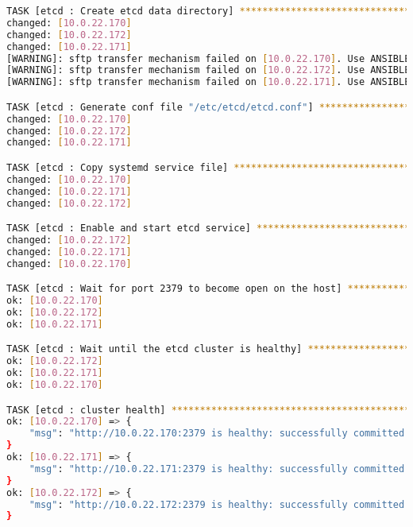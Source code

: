 \begin{flushleft}
\begin{lstlisting}[language=bash, caption=Deploy - Anhang - Deployt,captionpos=b,label={lst:deploy-appendix-deployt},breaklines=true]
TASK [etcd : Create etcd data directory] **************************************************************************************************************************************************************************
changed: [10.0.22.170]
changed: [10.0.22.172]
changed: [10.0.22.171]
[WARNING]: sftp transfer mechanism failed on [10.0.22.170]. Use ANSIBLE_DEBUG=1 to see detailed information
[WARNING]: sftp transfer mechanism failed on [10.0.22.172]. Use ANSIBLE_DEBUG=1 to see detailed information
[WARNING]: sftp transfer mechanism failed on [10.0.22.171]. Use ANSIBLE_DEBUG=1 to see detailed information

TASK [etcd : Generate conf file "/etc/etcd/etcd.conf"] ************************************************************************************************************************************************************
changed: [10.0.22.170]
changed: [10.0.22.172]
changed: [10.0.22.171]

TASK [etcd : Copy systemd service file] ***************************************************************************************************************************************************************************
changed: [10.0.22.170]
changed: [10.0.22.171]
changed: [10.0.22.172]

TASK [etcd : Enable and start etcd service] ***********************************************************************************************************************************************************************
changed: [10.0.22.172]
changed: [10.0.22.171]
changed: [10.0.22.170]

TASK [etcd : Wait for port 2379 to become open on the host] *******************************************************************************************************************************************************
ok: [10.0.22.170]
ok: [10.0.22.172]
ok: [10.0.22.171]

TASK [etcd : Wait until the etcd cluster is healthy] **************************************************************************************************************************************************************
ok: [10.0.22.172]
ok: [10.0.22.171]
ok: [10.0.22.170]

TASK [etcd : cluster health] **************************************************************************************************************************************************************************************
ok: [10.0.22.170] => {
    "msg": "http://10.0.22.170:2379 is healthy: successfully committed proposal: took = 2.588786ms\n"
}
ok: [10.0.22.171] => {
    "msg": "http://10.0.22.171:2379 is healthy: successfully committed proposal: took = 5.296369ms\n"
}
ok: [10.0.22.172] => {
    "msg": "http://10.0.22.172:2379 is healthy: successfully committed proposal: took = 2.024139ms\n"
}


\end{lstlisting}
\end{flushleft}
